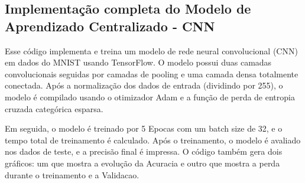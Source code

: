 \subsection{Implementação completa do Modelo de Aprendizado Centralizado - CNN}

Esse código implementa e treina um modelo de rede neural convolucional (CNN) em dados do MNIST usando TensorFlow. O modelo possui duas camadas convolucionais seguidas por camadas de pooling e uma camada densa totalmente conectada. Após a normalização dos dados de entrada (dividindo por 255), o modelo é compilado usando o otimizador Adam e a função de perda de entropia cruzada categórica esparsa.

Em seguida, o modelo é treinado por 5 Epocas com um batch size de 32, e o tempo total de treinamento é calculado. Após o treinamento, o modelo é avaliado nos dados de teste, e a precisão final é impressa. O código também gera dois gráficos: um que mostra a evolução da Acuracia e outro que mostra a perda durante o treinamento e a Validacao.

